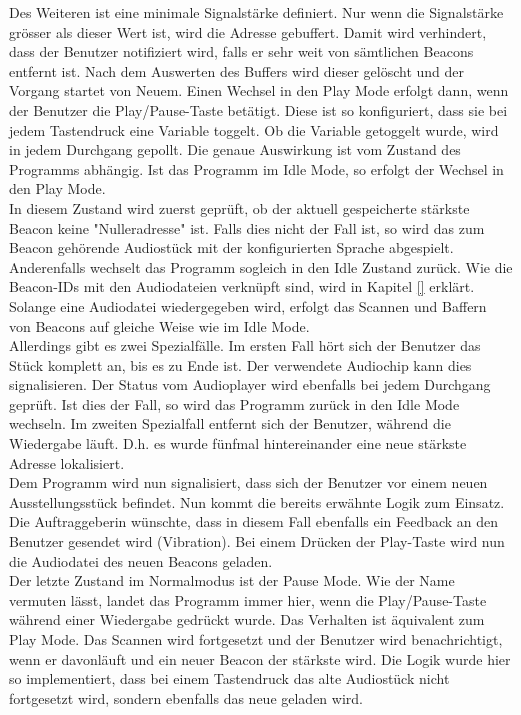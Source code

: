 Des Weiteren ist eine minimale Signalstärke definiert. Nur wenn die Signalstärke grösser als dieser Wert ist, wird die Adresse gebuffert. Damit wird verhindert, dass der Benutzer notifiziert wird, falls er sehr weit von sämtlichen Beacons entfernt ist.
Nach dem Auswerten des Buffers wird dieser gelöscht und der Vorgang startet von Neuem. Einen Wechsel in den Play Mode erfolgt dann, wenn der Benutzer die Play/Pause-Taste betätigt. Diese ist so konfiguriert, dass sie bei jedem Tastendruck eine Variable toggelt. Ob die Variable getoggelt wurde, wird in jedem Durchgang gepollt. Die genaue Auswirkung ist vom Zustand des Programms abhängig. Ist das Programm im Idle Mode, so erfolgt der Wechsel in den Play Mode.\\
In diesem Zustand wird zuerst geprüft, ob der aktuell gespeicherte stärkste Beacon keine "Nulleradresse" ist. Falls dies nicht der Fall ist, so wird das zum Beacon gehörende Audiostück mit der konfigurierten Sprache abgespielt. Anderenfalls wechselt das Programm sogleich in den Idle Zustand zurück. Wie die Beacon-IDs mit den Audiodateien verknüpft sind, wird in Kapitel \ref{} erklärt.
Solange eine Audiodatei wiedergegeben wird, erfolgt das Scannen und Baffern von Beacons auf gleiche Weise wie im Idle Mode.\\ Allerdings gibt es zwei Spezialfälle. Im ersten Fall hört sich der Benutzer das Stück komplett an, bis es zu Ende ist. Der verwendete Audiochip kann dies signalisieren. Der Status vom Audioplayer wird ebenfalls bei jedem Durchgang geprüft. Ist dies der Fall, so wird das Programm zurück in den Idle Mode wechseln. Im zweiten Spezialfall entfernt sich der Benutzer, während die Wiedergabe läuft. D.h. es wurde fünfmal hintereinander eine neue stärkste Adresse lokalisiert.\\ Dem Programm wird nun signalisiert, dass sich der Benutzer vor einem neuen Ausstellungsstück befindet. Nun kommt die bereits erwähnte Logik zum Einsatz. Die Auftraggeberin wünschte, dass in diesem Fall ebenfalls ein Feedback an den Benutzer gesendet wird (Vibration). Bei einem Drücken der Play-Taste wird nun die Audiodatei des neuen Beacons geladen.\\
Der letzte Zustand im Normalmodus ist der Pause Mode. Wie der Name vermuten lässt, landet das Programm immer hier, wenn die Play/Pause-Taste während einer Wiedergabe gedrückt wurde. Das Verhalten ist äquivalent zum Play Mode. Das Scannen wird fortgesetzt und der Benutzer wird benachrichtigt, wenn er davonläuft und ein neuer Beacon der stärkste wird. Die Logik wurde hier so implementiert, dass bei einem Tastendruck das alte Audiostück nicht fortgesetzt wird, sondern ebenfalls das neue geladen wird. 
